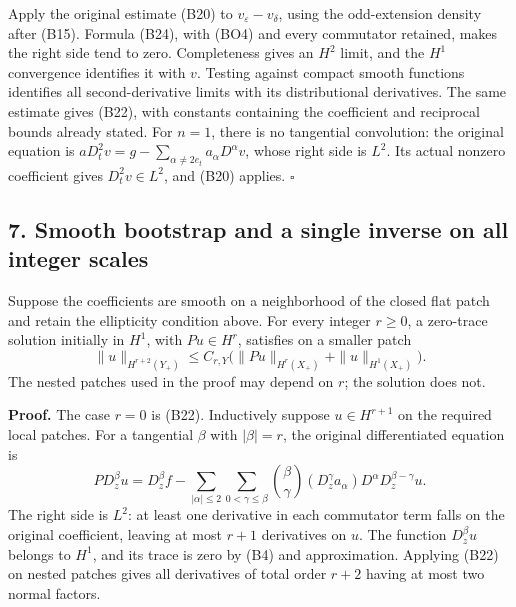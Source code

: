 \documentclass[
  11pt,
]{article}
\makeatletter
\let\ReaderOriginalAnchorStart\hyper@anchorstart
\let\ReaderOriginalAnchorEnd\hyper@anchorend
\let\ReaderPendingAliases\@empty
\def\ReaderArmAliases#1{\gdef\ReaderPendingAliases{#1}}
\def\hyper@anchorstart#1{\ReaderIfNativeAnchorTF{#1}{\ReaderPendingAliases\global\let\ReaderPendingAliases\@empty}{}\ReaderOriginalAnchorStart{#1}}
\makeatother
\begin{document}
Apply the original estimate (B20) to \(v_\varepsilon-v_\delta\), using
the odd-extension density after (B15). Formula (B24), with (BO4) and
every commutator retained, makes the right side tend to zero.
Completeness gives an \(H^2\) limit, and the \(H^1\) convergence
identifies it with \(v\). Testing against compact smooth functions
identifies all second-derivative limits with its distributional
derivatives. The same estimate gives (B22), with constants containing
the coefficient and reciprocal bounds already stated. For \(n=1\), there
is no tangential convolution: the original equation is
\(aD_t^2v=g-\sum_{\alpha\ne2e_t}a_\alpha D^\alpha v\), whose right side
is \(L^2\). Its actual nonzero coefficient gives \(D_t^2v\in L^2\), and
(B20) applies. \(\square\)

\ReaderArmAliases{\ReaderOriginalAnchorStart{AN03-SBD-007}\ReaderOriginalAnchorEnd\begingroup\expandafter\def\csname @currentHref\endcsname{AN03-SBD-007}\label{AN03-SBD-007}\endgroup\ReaderOriginalAnchorStart{an03-sbd-007-smooth-bootstrap-and-a-single-inverse-on-all-integer-scales}\ReaderOriginalAnchorEnd\begingroup\expandafter\def\csname @currentHref\endcsname{an03-sbd-007-smooth-bootstrap-and-a-single-inverse-on-all-integer-scales}\label{an03-sbd-007-smooth-bootstrap-and-a-single-inverse-on-all-integer-scales}\endgroup\ReaderOriginalAnchorStart{7-smooth-bootstrap-and-a-single-inverse-on-all-integer-scales}\ReaderOriginalAnchorEnd\begingroup\expandafter\def\csname @currentHref\endcsname{7-smooth-bootstrap-and-a-single-inverse-on-all-integer-scales}\label{7-smooth-bootstrap-and-a-single-inverse-on-all-integer-scales}\endgroup\ReaderOriginalAnchorStart{smooth-bootstrap-and-a-single-inverse-on-all-integer-scales}\ReaderOriginalAnchorEnd}
\subsection{7. Smooth bootstrap and a single inverse on all integer
scales}\label{smooth-bootstrap-and-a-single-inverse-on-all-integer-scales}

Suppose the coefficients are smooth on a neighborhood of the closed flat
patch and retain the ellipticity condition above. For every integer
\(r\geq0\), a zero-trace solution initially in \(H^1\), with
\(Pu\in H^r\), satisfies on a smaller patch \[
 \|u\|_{H^{r+2}(Y_+)}\leq C_{r,Y}\bigl(\|Pu\|_{H^r(X_+)}+\|u\|_{H^1(X_+)}\bigr). \tag{B25}
\] The nested patches used in the proof may depend on \(r\); the
solution does not.

\textbf{Proof.} The case \(r=0\) is (B22). Inductively suppose
\(u\in H^{r+1}\) on the required local patches. For a tangential
\(\beta\) with \(|\beta|=r\), the original differentiated equation is \[
 PD_z^\beta u
 =D_z^\beta f-
   \sum_{|\alpha|\leq2}\sum_{0<\gamma\leq\beta}
       \binom\beta\gamma(D_z^\gamma a_\alpha)
                 D^\alpha D_z^{\beta-\gamma}u.
 \tag{BO5}
\] The right side is \(L^2\): at least one derivative in each commutator
term falls on the original coefficient, leaving at most \(r+1\)
derivatives on \(u\). The function \(D_z^\beta u\) belongs to \(H^1\),
and its trace is zero by (B4) and approximation. Applying (B22) on
nested patches gives all derivatives of total order \(r+2\) having at
most two normal factors.
\end{document}
